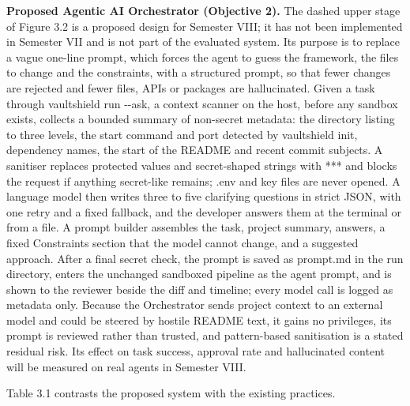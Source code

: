 \documentclass[12pt,a4paper,oneside]{report}
\begin{document}
\textbf{Proposed Agentic AI Orchestrator (Objective 2).}\label{proposed-orchestrator} The dashed upper stage of Figure 3.2 is a proposed design for Semester VIII; it has not been implemented in Semester VII and is not part of the evaluated system. Its purpose is to replace a vague one-line prompt, which forces the agent to guess the framework, the files to change and the constraints, with a structured prompt, so that fewer changes are rejected and fewer files, APIs or packages are hallucinated. Given a task through vaultshield run -\allowbreak{}-ask, a context scanner on the host, before any sandbox exists, collects a bounded summary of non-secret metadata: the directory listing to three levels, the start command and port detected by vaultshield init, dependency names, the start of the README and recent commit subjects. A sanitiser replaces protected values and secret-shaped strings with *** and blocks the request if anything secret-like remains; .env and key files are never opened. A language model then writes three to five clarifying questions in strict JSON, with one retry and a fixed fallback, and the developer answers them at the terminal or from a file. A prompt builder assembles the task, project summary, answers, a fixed Constraints section that the model cannot change, and a suggested approach. After a final secret check, the prompt is saved as prompt.md in the run directory, enters the unchanged sandboxed pipeline as the agent prompt, and is shown to the reviewer beside the diff and timeline; every model call is logged as metadata only. Because the Orchestrator sends project context to an external model and could be steered by hostile README text, it gains no privileges, its prompt is reviewed rather than trusted, and pattern-based sanitisation is a stated residual risk. Its effect on task success, approval rate and hallucinated content will be measured on real agents in Semester VIII.

Table 3.1 contrasts the proposed system with the existing practices.
\end{document}
